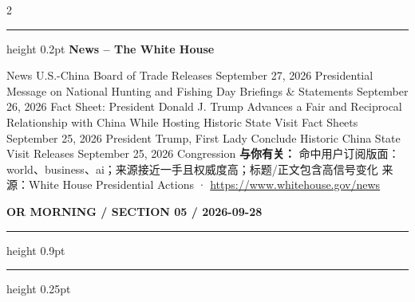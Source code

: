 \documentclass[10.5pt]{ctexart}
\begin{document}
\begin{multicols}{2}
\vspace{2mm}
\hrule height 0.2pt
\vspace{2mm}
{\large\bfseries News – The White House}\par
News U.S.-China Board of Trade Releases September 27, 2026 Presidential Message on National Hunting and Fishing Day Briefings \& Statements September 26, 2026 Fact Sheet: President Donald J. Trump Advances a Fair and Reciprocal Relationship with China While Hosting Historic State Visit Fact Sheets September 25, 2026 President Trump, First Lady Conclude Historic China State Visit Releases September 25, 2026 Congression
\textbf{与你有关：} 命中用户订阅版面：world、business、ai；来源接近一手且权威度高；标题/正文包含高信号变化
{\footnotesize\color{ormuted} 来源：White House Presidential Actions · \url{https://www.whitehouse.gov/news}}
\end{multicols}
\newpage
{\small\bfseries OR MORNING / SECTION 05 / 2026-09-28}
\vspace{2mm}
\hrule height 0.9pt
\vspace{1.5mm}
\hrule height 0.25pt
\vspace{4mm}
\end{document}
